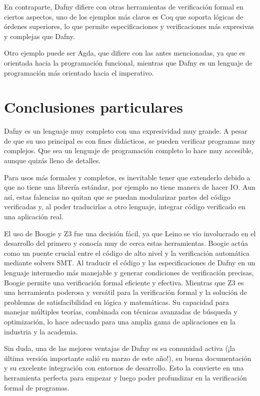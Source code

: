 \documentclass[runningheads]{llncs}
\begin{document}
En contraparte, Dafny difiere con otras herramientas de verificación formal en ciertos aspectos, uno de los ejemplos más claros es Coq 
que soporta lógicas de órdenes superiores, lo que permite especificaciones y verificaciones más expresivas y complejas que Dafny.

Otro ejemplo puede ser Agda, que difiere con las antes mencionadas, ya que 
es orientada hacia la programación funcional, mientras que Dafny es un lenguaje de programación más orientado hacia el imperativo. 
 
\section{Conclusiones particulares}

Dafny es un lenguaje muy completo con una expresividad muy grande. A pesar de que su uso principal es con fines didácticos, se pueden verificar programas muy complejos. 
Que sea un lenguaje de programación completo lo hace muy accesible, aunque quizás lleno de detalles.

Para usos más formales y completos, es inevitable tener que extenderlo debido a que no tiene una librería estándar, por ejemplo no tiene manera de hacer IO.
Aun así, estas falencias no quitan que se puedan modularizar partes del código verificadas y, al poder traducirlas a otro lenguaje, integrar código verificado en una aplicación real.

El uso de Boogie y Z3 fue una decisión fácil, ya que Leino se vio involucrado en el desarrollo del primero y conocía muy de cerca estas herramientas.
Boogie actúa como un puente crucial entre el código de alto nivel y la verificación automática mediante solvers SMT. 
Al traducir el código y las especificaciones de Dafny en un lenguaje intermedio más manejable y generar condiciones de verificación precisas, 
Boogie permite una verificación formal eficiente y efectiva.
Mientras que Z3 es una herramienta poderosa y versátil para la verificación formal y la solución de problemas de satisfacibilidad en lógica y matemáticas. 
Su capacidad para manejar múltiples teorías, combinada con técnicas avanzadas de búsqueda y optimización, 
lo hace adecuado para una amplia gama de aplicaciones en la industria y la academia.

Sin duda, una de las mejores ventajas de Dafny es su comunidad activa (¡la última versión importante salió en marzo de este año!), 
su buena documentación y su excelente integración con entornos de desarrollo. Esto la convierte en una herramienta perfecta para empezar 
y luego poder profundizar en la verificación formal de programas.



\end{document}

